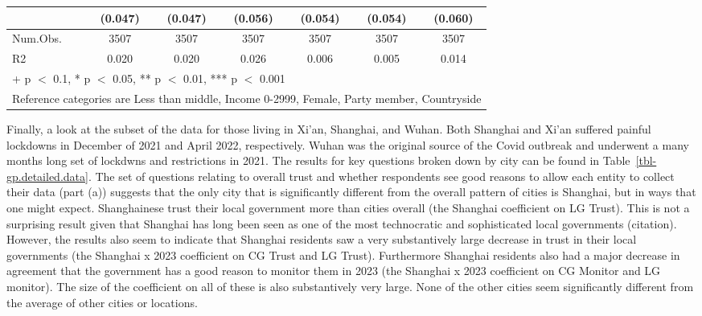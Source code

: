 \documentclass[
  letterpaper,
  DIV=11,
  numbers=noendperiod]{scrartcl}
\begin{document}
\begin{table}
\begin{tabular}[t]{lcccccc}
 & (\num{0.047}) & (\num{0.047}) & (\num{0.056}) & (\num{0.054}) & (\num{0.054}) & (\num{0.060})\\
\midrule
Num.Obs. & \num{3507} & \num{3507} & \num{3507} & \num{3507} & \num{3507} & \num{3507}\\
R2 & \num{0.020} & \num{0.020} & \num{0.026} & \num{0.006} & \num{0.005} & \num{0.014}\\
\bottomrule
\multicolumn{7}{l}{\rule{0pt}{1em}+ p $<$ 0.1, * p $<$ 0.05, ** p $<$ 0.01, *** p $<$ 0.001}\\
\multicolumn{7}{l}{\rule{0pt}{1em}Reference categories are Less than middle, Income 0-2999, Female, Party member, Countryside}\\
\end{tabular}
\end{table}

Finally, a look at the subset of the data for those living in Xi'an,
Shanghai, and Wuhan. Both Shanghai and Xi'an suffered painful lockdowns
in December of 2021 and April 2022, respectively. Wuhan was the original
source of the Covid outbreak and underwent a many months long set of
lockdwns and restrictions in 2021. The results for key questions broken
down by city can be found in Table~\ref{tbl-gp.detailed.data}. The set
of questions relating to overall trust and whether respondents see good
reasons to allow each entity to collect their data (part (a)) suggests
that the only city that is significantly different from the overall
pattern of cities is Shanghai, but in ways that one might expect.
Shanghainese trust their local government more than cities overall (the
Shanghai coefficient on LG Trust). This is not a surprising result given
that Shanghai has long been seen as one of the most technocratic and
sophisticated local governments (citation). However, the results also
seem to indicate that Shanghai residents saw a very substantively large
decrease in trust in their local governments (the Shanghai x 2023
coefficient on CG Trust and LG Trust). Furthermore Shanghai residents
also had a major decrease in agreement that the government has a good
reason to monitor them in 2023 (the Shanghai x 2023 coefficient on CG
Monitor and LG monitor). The size of the coefficient on all of these is
also substantively very large. None of the other cities seem
significantly different from the average of other cities or locations.
\end{document}
